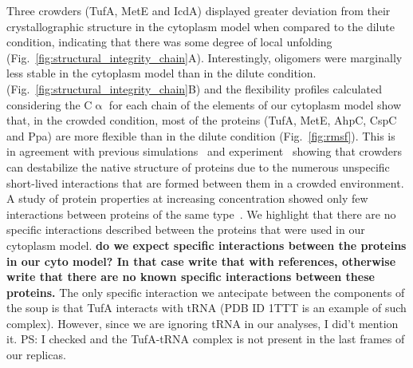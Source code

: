 \documentclass[journal=jcisd8,manuscript=article]{achemso}
\begin{document}
Three crowders (TufA, MetE and IcdA) displayed greater deviation from
their crystallographic structure in the cytoplasm model when compared
to the dilute condition, indicating that there was some degree of
local unfolding
(Fig.~\ref{fig:structural_integrity_chain}A). Interestingly, oligomers
were marginally less stable in the cytoplasm model than in the dilute condition.
(Fig.~\ref{fig:structural_integrity_chain}B) and the flexibility
profiles calculated considering the C$\upalpha$ for each chain of the
elements of our cytoplasm model show that, in the crowded condition,
most of the proteins (TufA, MetE, AhpC, CspC and Ppa) are more flexible than in the dilute condition (Fig.~\ref{fig:rmsf}). This
is in agreement with previous simulations~\cite{Feig2011} and
experiment~\cite{miklos2011,Wang2012b} showing that crowders can
destabilize the native structure of proteins due to the numerous
unspecific short-lived interactions that are formed between them in a
crowded environment. A study of protein properties at increasing
concentration showed only few interactions between proteins of the
same type~\cite{Bashardanesh2019a}. {\color{blue} We highlight that there are no specific interactions described between the proteins that were used in our cytoplasm model.} {\bf do we expect specific interactions between the proteins in our cyto model? In that case write that with references, otherwise write that there are no known specific interactions between these proteins.} {\color{blue} The only specific interaction we antecipate between the components of the soup is that TufA interacts with tRNA (PDB ID 1TTT is an example of such complex). However, since we are ignoring tRNA in our analyses, I did't mention it. PS: I checked and the TufA-tRNA complex is not present in the last frames of our replicas.}
\end{document}

